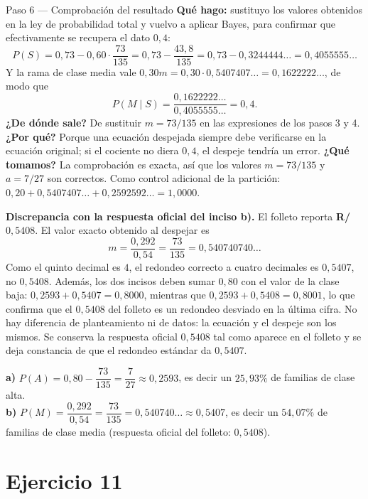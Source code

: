 \documentclass[11pt]{article}
\begin{document}
\begin{sol}
\begin{paso}{Paso 6 --- Comprobación del resultado}
\textbf{Qué hago:} sustituyo los valores obtenidos en la ley de probabilidad total y vuelvo a aplicar Bayes, para confirmar que efectivamente se recupera el dato $0,4$:
\[
P(S)=0,73-0,60\cdot\frac{73}{135}=0,73-\frac{43,8}{135}=0,73-0,3244444\ldots=0,4055555\ldots
\]
Y la rama de clase media vale $0,30m=0,30\cdot 0,5407407\ldots=0,1622222\ldots$, de modo que
\[
P(M\mid S)=\frac{0,1622222\ldots}{0,4055555\ldots}=0,4 .
\]
\textbf{¿De dónde sale?} De sustituir $m=73/135$ en las expresiones de los pasos 3 y 4.
\textbf{¿Por qué?} Porque una ecuación despejada siempre debe verificarse en la ecuación original; si el cociente no diera $0,4$, el despeje tendría un error.
\textbf{¿Qué tomamos?} La comprobación es exacta, así que los valores $m=73/135$ y $a=7/27$ son correctos. Como control adicional de la partición: $0,20+0,5407407\ldots+0,2592592\ldots=1,0000$.
\end{paso}

\begin{nota}
\textbf{Discrepancia con la respuesta oficial del inciso b).} El folleto reporta \textbf{R/ $0,5408$}. El valor exacto obtenido al despejar es
\[
m=\frac{0,292}{0,54}=\frac{73}{135}=0,540740740\ldots
\]
Como el quinto decimal es $4$, el redondeo correcto a cuatro decimales es $0,5407$, no $0,5408$. Además, los dos incisos deben sumar $0,80$ con el valor de la clase baja: $0,2593+0,5407=0,8000$, mientras que $0,2593+0,5408=0,8001$, lo que confirma que el $0,5408$ del folleto es un redondeo desviado en la última cifra. No hay diferencia de planteamiento ni de datos: la ecuación y el despeje son los mismos. Se conserva la respuesta oficial $0,5408$ tal como aparece en el folleto y se deja constancia de que el redondeo estándar da $0,5407$.
\end{nota}

\begin{resp}
\textbf{a)} $P(A)=0,80-\dfrac{73}{135}=\dfrac{7}{27}\approx 0,2593$, es decir un $25,93\%$ de familias de clase alta.\\
\textbf{b)} $P(M)=\dfrac{0,292}{0,54}=\dfrac{73}{135}=0,540740\ldots\approx 0,5407$, es decir un $54,07\%$ de familias de clase media \quad (respuesta oficial del folleto: $0,5408$).
\end{resp}

\end{sol}

\newpage
\section*{Ejercicio 11}
\end{document}
